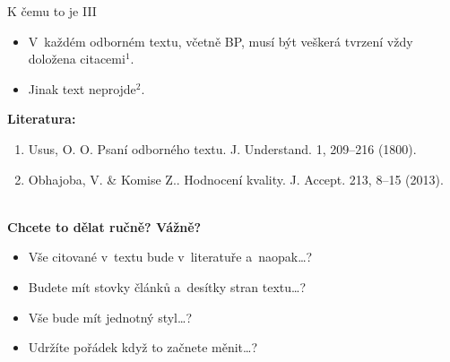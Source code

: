 \documentclass[compress, ucs, xelatex, 11pt, xcolor=svgnames, aspectratio=169,
	hyperref={
		bookmarks=true,
		unicode=true,
		colorlinks=true,
		pdftitle={Citacni software},
		plainpages=false,
		pdfauthor={Vojtech Zeisek},
		pdfsubject={Kratky uvod do citacniho software},
		pdfcreator={XeLaTeX},
		pdfkeywords={citace, reference, software, literatura},
		linkcolor=Crimson, %
		anchorcolor=Magenta, %
		citecolor=Magenta, %
		filecolor=Magenta, %
		menucolor=Magenta, %
		urlcolor=DarkTurquoise, %
		pdftex},
	url={hyphens, lowtilde} %
	]{beamer}
\begin{document}
\begin{frame}{K čemu to je III}
	\begin{itemize}
		\item V~každém odborném textu, včetně BP, musí být veškerá tvrzení vždy doložena citacemi$^{1}$.
		\item Jinak text neprojde$^{2}$.
	\end{itemize}
	\textbf{Literatura:}
	\begin{enumerate}
		\item Usus, O. O. Psaní odborného textu. J. Understand. 1, 209–216 (1800).
		\item Obhajoba, V. \& Komise Z.. Hodnocení kvality. J. Accept. 213, 8–15 (2013).
	\end{enumerate}
	\hrulefill\\
	\textbf{Chcete to dělat ručně? Vážně?}
	\begin{itemize}
		\item Vše citované v~textu bude v~literatuře a~naopak\ldots?
		\item Budete mít stovky článků a~desítky stran textu\ldots?
		\item Vše bude mít jednotný styl\ldots?
		\item Udržíte pořádek když to začnete měnit\ldots?
	\end{itemize}
\end{frame}
\end{document}
